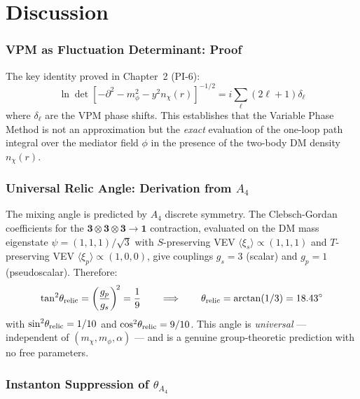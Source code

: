 \documentclass[12pt,a4paper]{article}
\newcommand{\thetarel}{\theta_{\rm relic}}
\begin{document}
\part*{Discussion}




\section{VPM as Fluctuation Determinant: Proof}
\label{app:vpm_proof}

The key identity proved in Chapter~2 (PI-6):
\begin{equation}
  \ln \det\!\left[-\partial^2 - m_\phi^2 - y^2 n_\chi(r)\right]^{-1/2}
  = i\sum_\ell (2\ell+1)\delta_\ell
\end{equation}
where $\delta_\ell$ are the VPM phase shifts. This establishes that the
Variable Phase Method is not an approximation but the \emph{exact} evaluation
of the one-loop path integral over the mediator field $\phi$ in the presence
of the two-body DM density $n_\chi(r)$.

\section{Universal Relic Angle: Derivation from \texorpdfstring{$A_4$}{A4}}
\label{app:relic_angle}

The mixing angle is predicted by $A_4$ discrete symmetry.  The Clebsch-Gordan
coefficients for the $\mathbf{3}\otimes\mathbf{3}\otimes\mathbf{3}\to\mathbf{1}$
contraction, evaluated on the DM mass eigenstate
$\psi = (1,1,1)/\sqrt{3}$ with $S$-preserving VEV
$\langle\xi_s\rangle \propto (1,1,1)$ and $T$-preserving VEV
$\langle\xi_p\rangle \propto (1,0,0)$, give couplings
$g_s = 3$ (scalar) and $g_p = 1$ (pseudoscalar).  Therefore:
\begin{equation}
  \tan^2\!\thetarel = \left(\frac{g_p}{g_s}\right)^{\!2} = \frac{1}{9}
  \qquad\Longrightarrow\qquad
  \thetarel = \arctan(1/3) = 18.43^\circ
\end{equation}
with $\sin^2\!\thetarel = 1/10$ and $\cos^2\!\thetarel = 9/10$.
This angle is \emph{universal} — independent of $(m_\chi, m_\phi, \alpha)$ —
and is a genuine group-theoretic prediction with no free parameters.

\section{Instanton Suppression of \texorpdfstring{$\theta_{A_4}$}{theta-A4}}
\label{app:instanton}
\end{document}
